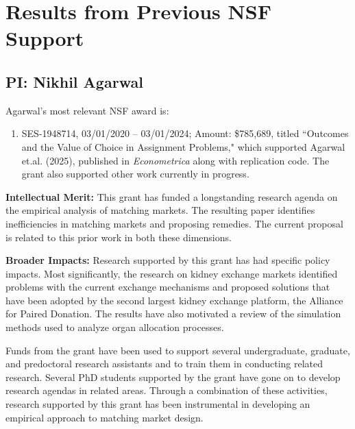 \documentclass[11pt]{article}
\begin{document}
\section{Results from Previous NSF Support}
\subsection{PI: Nikhil Agarwal}

Agarwal's most relevant NSF award is:
\begin{enumerate}
    \item SES-1948714, 03/01/2020 – 03/01/2024; Amount: \$785,689, titled ``Outcomes and the Value of Choice in Assignment Problems," which supported Agarwal et.al. (2025), published in \emph{Econometrica} along with replication code. The grant also supported other work currently in progress.
\end{enumerate} 
\noindent\textbf{Intellectual Merit:} This grant has funded a
longstanding research agenda on the empirical analysis of matching
markets. The resulting paper identifies inefficiencies in matching markets and proposing remedies. The current proposal is related to this prior work in both these dimensions.

\noindent\textbf{Broader Impacts: }Research supported by this grant
has had specific policy impacts. Most significantly, the research
on kidney exchange markets identified problems with the current exchange
mechanisms and proposed solutions that have been adopted by the
second largest kidney exchange platform, the Alliance for Paired Donation. The results have also motivated a review of the simulation methods used to analyze organ allocation
processes.

Funds from the grant have been used to support several undergraduate, graduate, and predoctoral research assistants and to train them in conducting
related research. Several PhD students supported by the grant have
gone on to develop research agendas in related areas. Through a combination
of these activities, research supported by this grant has been instrumental
in developing an empirical approach to matching market design.
\end{document}
